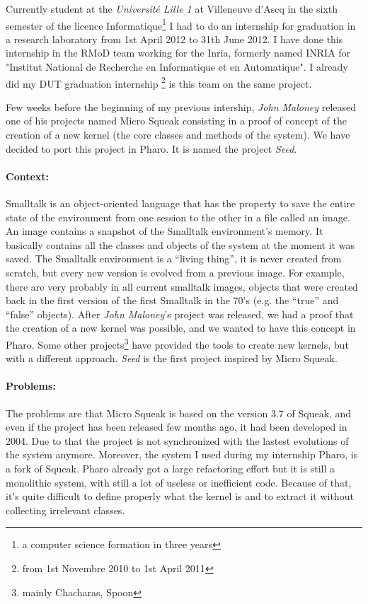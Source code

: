 Currently student at the \emph{Universit\'{e} Lille 1} at Villeneuve d'Ascq in the sixth semester of the licence Informatique\footnote{a computer science formation in three years} I had to do an internship for graduation in a research laboratory from 1st April 2012 to 31th June 2012. I have done this internship in the RMoD team working for the Inria, formerly named INRIA for "Institut National de Recherche en Informatique et en Automatique". I already did my DUT graduation internship \footnote{from 1st Novembre 2010 to 1st April 2011} is this team on the same project.

Few weeks before the beginning of my previous intership, \emph{John Maloney} released one of his projects named \gls{Micro Squeak} consisting in a proof of concept of the creation of a new kernel (the core classes and methods of the system).
We have decided to port this project in \gls{Pharo}. It is named the project \emph{Seed}.

\paragraph{Context:}
Smalltalk is an object-oriented language that has the property to save the entire state of the environment from one session to the other in a file called an image. An image contains a snapshot of the Smalltalk environment's memory. It basically contains all the classes and objects of the system at the moment it was saved. The Smalltalk environment is a ``living thing'', it is never created from scratch, but every new version is evolved from a previous image. For example, there are very probably in all current smalltalk images, objects that were created back in the first version of the first Smalltalk in the 70's (e.g. the ``true'' and ``false'' objects).
After \emph{John Maloney}'s project was released, we had a proof that the creation of a new kernel was possible, and we wanted to have this concept in \gls{Pharo}. Some other projects\footnote{mainly Chacharas, Spoon } have provided the tools to create new kernels, but with a different approach. \emph{Seed} is the first project inspired by \gls{Micro Squeak}.

\paragraph{Problems:}
The problems are that \gls{Micro Squeak} is based on the version 3.7 of Squeak, and even if the project has been released few months ago, it had been developed in 2004. Due to that the project is not synchronized with the lastest evolutions of the system anymore. Moreover, the system I used during my internship \gls{Pharo}, is a fork of Squeak. Pharo already got a large refactoring effort but it is still a monolithic system, with still a lot of useless or inefficient code. Because of that, it's quite difficult to define properly what the kernel is and to extract it without collecting irrelevant classes.

